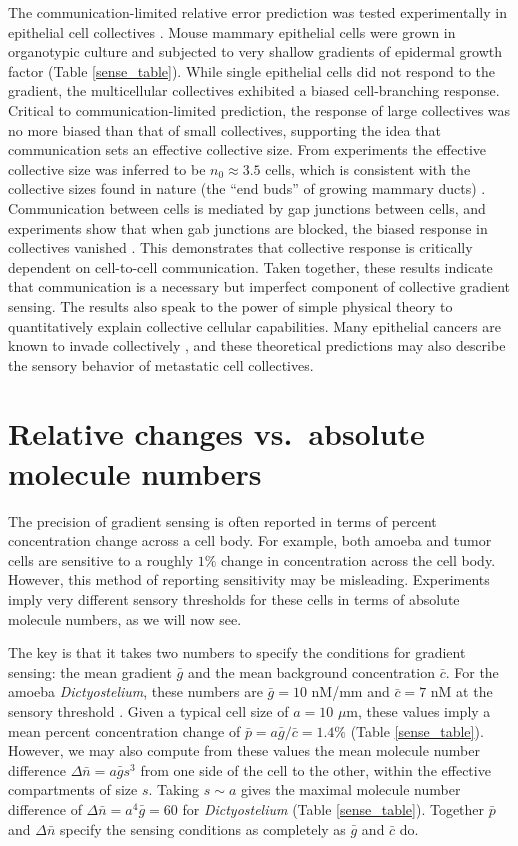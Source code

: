 The communication-limited relative error prediction was tested experimentally in epithelial cell collectives \cite{ellison2016cell}. Mouse mammary epithelial cells were grown in organotypic culture and subjected to very shallow gradients of epidermal growth factor (Table \ref{sense_table}). While single epithelial cells did not respond to the gradient, the multicellular collectives exhibited a biased cell-branching response. Critical to communication-limited prediction, the response of large collectives was no more biased than that of small collectives, supporting the idea that communication sets an effective collective size. From experiments the effective collective size was inferred to be $n_0 \approx 3.5$ cells, which is consistent with the collective sizes found in nature (the ``end buds'' of growing mammary ducts) \cite{lu2008genetic}.
Communication between cells is mediated by gap junctions between cells, and experiments show that when gab junctions are blocked, the biased response in collectives vanished \cite{ellison2016cell}. This demonstrates that collective response is critically dependent on cell-to-cell communication. Taken together, these results indicate that communication is a necessary but imperfect component of collective gradient sensing. The results also speak to the power of simple physical theory to quantitatively explain collective cellular capabilities. Many epithelial cancers are known to invade collectively \cite{cheung2013collective}, and these theoretical predictions may also describe the sensory behavior of metastatic cell collectives.


\section{Relative changes vs.\ absolute molecule numbers}

The precision of gradient sensing is often reported in terms of percent concentration change across a cell body. For example, both amoeba \cite{van2007biased} and tumor cells \cite{shields2007autologous} are sensitive to a roughly $1\%$ change in concentration across the cell body. However, this method of reporting sensitivity may be misleading. Experiments imply very different sensory thresholds for these cells in terms of absolute molecule numbers, as we will now see.

The key is that it takes two numbers to specify the conditions for gradient sensing: the mean gradient $\bar{g}$ and the mean background concentration $\bar{c}$. For the amoeba \textit{Dictyostelium}, these numbers are $\bar{g} = 10$ nM/mm and $\bar{c} = 7$ nM at the sensory threshold \cite{van2007biased}. Given a typical cell size of $a = 10$ $\mu$m, these values imply a mean percent concentration change of $\bar{p} = a\bar{g}/\bar{c} = 1.4\%$ (Table \ref{sense_table}). However, we may also compute from these values the mean molecule number difference
$\Delta\bar{n} = a\bar{g}s^3$
from one side of the cell to the other, within the effective compartments of size $s$. Taking $s\sim a$ gives the maximal molecule number difference of $\Delta\bar{n} = a^4\bar{g} = 60$
for \textit{Dictyostelium} (Table \ref{sense_table}). Together $\bar{p}$ and $\Delta\bar{n}$ specify the sensing conditions as completely as $\bar{g}$ and $\bar{c}$ do.

